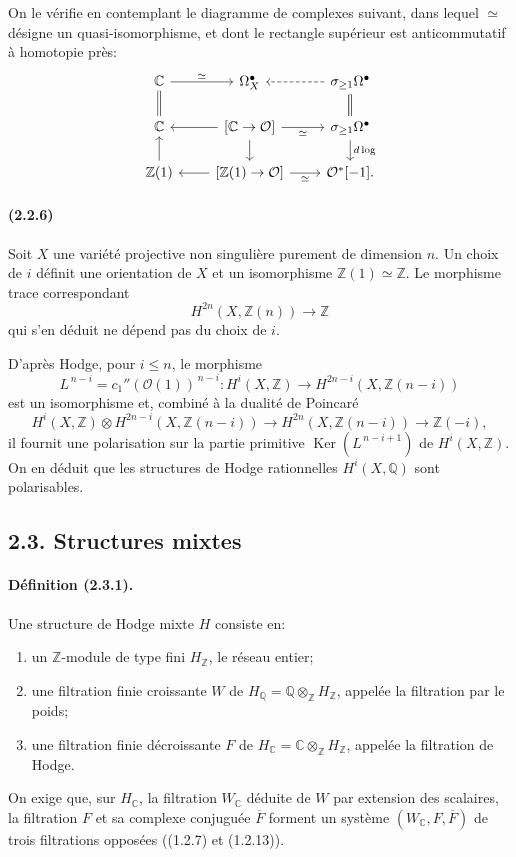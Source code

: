 \documentclass[10pt]{article}
\newcommand{\C}{\mathbb C}
\newcommand{\Q}{\mathbb Q}
\newcommand{\Z}{\mathbb Z}
\newcommand{\Ker}{\operatorname{Ker}}
\newcommand{\fg}{\guillemotright}
\newcommand{\og}{\guillemotleft}
\providecommand{\cO}{\mathcal O}
\providecommand{\cO}{\mathcal O}
\newcommand{\dlog}{d\log}
\begin{document}
On le vérifie en contemplant le diagramme de complexes suivant, dans lequel $\simeq$ désigne un quasi-isomorphisme, et dont le rectangle supérieur est anticommutatif à homotopie près:
\[
\begin{tikzcd}[column sep=2.2em,row sep=1.5em]
\C \arrow[r,"\simeq"] \arrow[d,equal] & \Omega_X^\bullet & \sigma_{\ge1}\Omega^\bullet \arrow[l,dashed] \arrow[d,equal]\\
\C & {[\C\to\cO]} \arrow[l] \arrow[r,"\simeq"'] \arrow[d] & \sigma_{\ge1}\Omega^\bullet \arrow[u,equal] \arrow[d,"\dlog"]\\
\Z(1) \arrow[u] & {[\Z(1)\to\cO]} \arrow[l] \arrow[r,"\simeq"'] & \cO^*[-1].
\end{tikzcd}
\]

\paragraph{(2.2.6)} Soit $X$ une variété projective non singulière purement de dimension $n$. Un choix de $i$ définit une orientation de $X$ et un isomorphisme $\Z(1)\simeq\Z$. Le morphisme trace correspondant
\[
H^{2n}(X,\Z(n))\longrightarrow \Z
\]
qui s'en déduit ne dépend pas du choix de $i$.

D'après Hodge, pour $i\le n$, le morphisme
\[
L^{\,n-i}=c_1''(\cO(1))^{\,n-i}:H^i(X,\Z)\longrightarrow H^{2n-i}(X,\Z(n-i))
\]
est un isomorphisme et, combiné à la dualité de Poincaré
\[
H^i(X,\Z)\otimes H^{2n-i}(X,\Z(n-i))\longrightarrow
H^{2n}(X,\Z(n-i))\longrightarrow \Z(-i),
\]
il fournit une polarisation sur la partie primitive $\Ker(L^{\,n-i+1})$ de $H^i(X,\Z)$. On en déduit que les structures de Hodge rationnelles $H^i(X,\Q)$ sont polarisables.

\subsection*{2.3. Structures mixtes}

\paragraph{Définition (2.3.1).} Une structure de Hodge mixte $H$ consiste en:
\begin{enumerate}[label=\alph*)]
\item un $\Z$-module de type fini $H_\Z$, le \og réseau entier\fg;
\item une filtration finie croissante $W$ de $H_\Q=\Q\otimes_\Z H_\Z$, appelée la filtration par le poids;
\item une filtration finie décroissante $F$ de $H_\C=\C\otimes_\Z H_\Z$, appelée la filtration de Hodge.
\end{enumerate}
On exige que, sur $H_\C$, la filtration $W_\C$ déduite de $W$ par extension des scalaires, la filtration $F$ et sa complexe conjuguée $\overline F$ forment un système $(W_\C,F,\overline F)$ de trois filtrations opposées ((1.2.7) et (1.2.13)).
\end{document}
